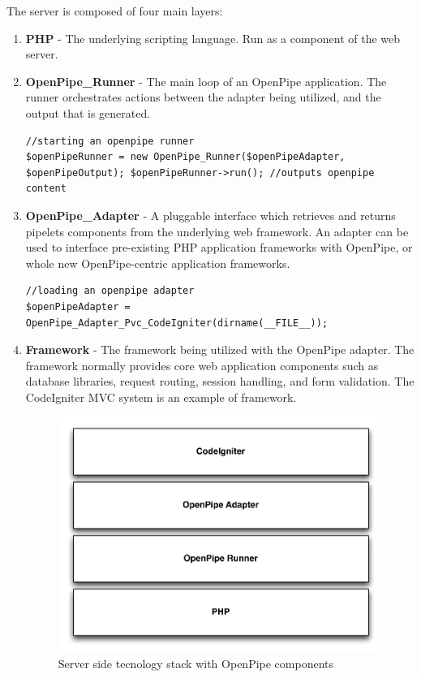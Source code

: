 \documentclass[12pt]{report}
\begin{document}
The server is composed of four main layers:

\begin{enumerate}
	\item \textbf{PHP} - The underlying scripting language. Run as a component of the web server.
	\item \textbf{OpenPipe\_Runner} - The main loop of an OpenPipe application. The runner orchestrates actions between the adapter being utilized, and the output that is generated.
		\begin{lstlisting}
//starting an openpipe runner
$openPipeRunner = new OpenPipe_Runner($openPipeAdapter, $openPipeOutput); $openPipeRunner->run(); //outputs openpipe content
		\end{lstlisting}

	\item \textbf{OpenPipe\_Adapter} - A pluggable interface which retrieves and returns pipelets components from the underlying web framework. An adapter can be used to interface pre-existing PHP application frameworks with OpenPipe, or whole new OpenPipe-centric application frameworks.
		\begin{lstlisting}
//loading an openpipe adapter
$openPipeAdapter = OpenPipe_Adapter_Pvc_CodeIgniter(dirname(__FILE__));
		\end{lstlisting}	

	\item \textbf{Framework} - The framework being utilized with the OpenPipe adapter. The framework normally provides core web application components such as database libraries, request routing, session handling, and form validation. The CodeIgniter MVC system is an example of framework.
	
		\begin{figure}[H]
		\label{fig:frameworkStack}
		\centering
		\includegraphics[width=\textwidth,keepaspectratio]{figures/images/framework_stack.pdf}
		\caption{Server side tecnology stack with OpenPipe components}
		\end{figure}

\end{enumerate}
\end{document}
